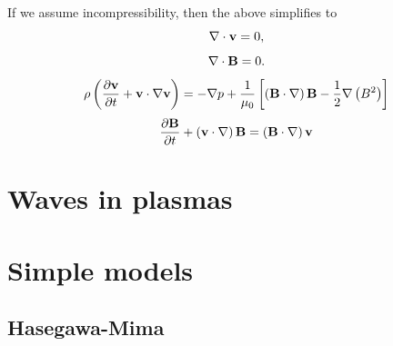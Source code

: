 \documentclass[oneside,a4paper,11pt]{report}
\begin{document}
If we assume incompressibility, then the above simplifies to
\begin{equation}
    \nabla \cdot \mathbf{v} = 0,
\end{equation}
\begin{equation}
    \nabla \cdot \mathbf{B} = 0.
    \end{equation}
\begin{equation}
    \rho \left (\frac{\partial \mathbf{v}}{\partial t} + \mathbf{v} \cdot \nabla \mathbf{v} \right ) = - \nabla p  + \frac{1}{\mu_0} \left [ \left ( \mathbf{B} \cdot \nabla \right ) \mathbf{B} - \frac{1}{2} \nabla \left ( B^2 \right ) \right ]
\end{equation}
\begin{equation}
    \frac{\partial \mathbf{B}}{\partial t} + \left ( \mathbf{v} \cdot \nabla \right ) \mathbf{B} = \left ( \mathbf{B} \cdot \nabla \right ) \mathbf{v}
\end{equation}

\chapter{Waves in plasmas}

\chapter{Simple models}
\section{Hasegawa-Mima}
\end{document}
